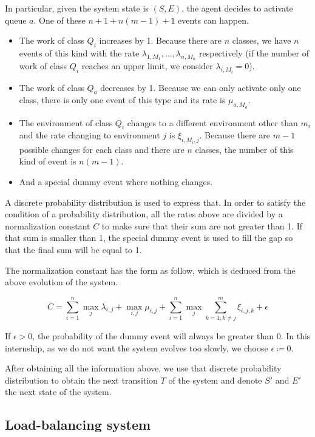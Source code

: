 \documentclass[
  a4paper, xcolor = usenames,dvipsnames]{article}
\providecommand{\tightlist}{%
  \setlength{\itemsep}{0pt}\setlength{\parskip}{0pt}}
\begin{document}
In particular, given the system state is \((S, E)\), the agent decides to activate queue \(a\). One of these \(n + 1 + n(m - 1) + 1\) events can happen.

\begin{itemize}
\tightlist
\item
  The work of class \(Q_{i}\) increases by 1. Because there are \(n\) classes, we have \(n\) events of this kind with the rate \(\lambda_{1, M_{1}}, \dots, \lambda_{n, M_{n}}\) respectively (if the number of work of class \(Q_{i}\) reaches an upper limit, we consider \(\lambda_{i, M_{i}} = 0\)).
\item
  The work of class \(Q_{a}\) decreases by 1. Because we can only activate only one class, there is only one event of this type and its rate is \(\mu_{a, M_{a}}\).
\item
  The environment of class \(Q_{i}\) changes to a different environment other than \(m_{i}\) and the rate changing to environment \(j\) is \(\xi_{i, M_{i}, j}\). Because there are \(m - 1\) possible changes for each class and there are \(n\) classes, the number of this kind of event is \(n(m - 1)\).
\item
  And a special dummy event where nothing changes.
\end{itemize}

A discrete probability distribution is used to express that. In order to satisfy the condition of a probability distribution, all the rates above are divided by a normalization constant \(C\) to make sure that their sum are not greater than 1. If that sum is smaller than 1, the special dummy event is used to fill the gap so that the final sum will be equal to 1.

The normalization constant has the form as follow, which is deduced from the above evolution of the system.

\[
C = \sum_{i = 1}^{n} \max_{j} \lambda_{i, j} + \max_{i, j} \mu_{i, j} + \sum_{i = 1}^{n} \max_{j} \sum_{k = 1, k \neq j}^{m} \xi_{i, j, k} + \epsilon
\]

If \(\epsilon > 0\), the probability of the dummy event will always be greater than 0. In this internship, as we do not want the system evolves too slowly, we choose \(\epsilon \coloneq 0\).

After obtaining all the information above, we use that discrete probability distribution to obtain the next transition \(T\) of the system and denote \(S'\) and \(E'\) the next state of the system.

\hypertarget{load-balancing-system}{%
\subsection{Load-balancing system}\label{load-balancing-system}}
\end{document}
